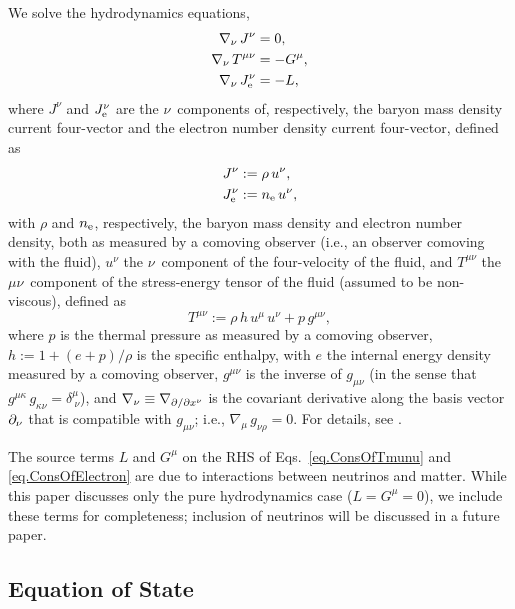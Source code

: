 We solve the hydrodynamics equations,
\begin{align}
  \nabla_{\nu}\,J^{\nu}&=0,\label{eq.ConsOfMass}\\
  \nabla_{\nu}\,T^{\mu\nu}&=-G^{\mu}\label{eq.ConsOfTmunu},\\
  \nabla_{\nu}\,J_{\mathrm{e}}^{\nu}&=-L\label{eq.ConsOfElectron},
\end{align}
where $J^{\nu}$ and $J_{\mathrm{e}}^{\nu}$ are the $\nu$\myth\ components of, respectively,
the baryon mass density current four-vector and
the electron number density current four-vector,
defined as
\begin{align}
  J^{\nu}&:=\rho\,u^{\nu},\\
  J_{\mathrm{e}}^{\nu}&:=n_{\mathrm{e}}\,u^{\nu},
\end{align}
with $\rho$ and $n_{\mathrm{e}}$, respectively, the baryon mass density
and electron number density, both as measured by a comoving observer
(i.e., an observer comoving with the fluid),
$u^{\nu}$ the $\nu$\myth\ component of the four-velocity of the fluid,
and $T^{\mu\nu}$ the $\mu\nu$\myth\ component of the
stress-energy tensor of the fluid (assumed to be non-viscous),
defined as
\begin{equation}
  T^{\mu\nu}:=\rho\,h\,u^{\mu}\,u^{\nu}+p\,g^{\mu\nu},
  \label{eq.Tmunu}
\end{equation}
where $p$ is the thermal pressure as measured by a comoving observer,
$h:=1+\left(e+p\right)/\rho$ is the specific enthalpy, with $e$ the internal
energy density measured by a comoving observer, $g^{\mu\nu}$ is the
inverse of $g_{\mu\nu}$ (in the sense that
$g^{\mu\kappa}\,g_{\kappa\nu}=\delta^{\mu}_{~\nu}$),
and $\nabla_{\nu}\equiv\nabla_{\partial/\partial x^{\nu}}$ is the covariant derivative along the basis vector
$\partial_{\nu}$ that is compatible
with $g_{\mu\nu}$; i.e., $\nabla_{\mu}\,g_{\nu\rho}=0$.
For details, see \citet{rz2013}.

The source terms $L$ and $G^{\mu}$ on the RHS of Eqs.~\eqref{eq.ConsOfTmunu}
and \eqref{eq.ConsOfElectron} are due to interactions between
neutrinos and matter.
While this paper discusses only the pure hydrodynamics case ($L=G^{\mu}=0$),
we include these terms for completeness;
inclusion of neutrinos will be discussed in a future paper.

\subsection{Equation of State}

